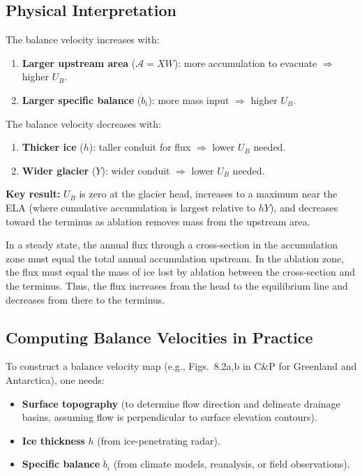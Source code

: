 \documentclass[11pt]{article}
\begin{document}
\subsection{Physical Interpretation}

The balance velocity increases with:
\begin{enumerate}
  \item \textbf{Larger upstream area} ($\mathcal{A} = XW$): more accumulation to evacuate $\Rightarrow$ higher $U_B$.
  \item \textbf{Larger specific balance} ($\dot{b}_i$): more mass input $\Rightarrow$ higher $U_B$.
\end{enumerate}

The balance velocity decreases with:
\begin{enumerate}[resume]
  \item \textbf{Thicker ice} ($h$): taller conduit for flux $\Rightarrow$ lower $U_B$ needed.
  \item \textbf{Wider glacier} ($Y$): wider conduit $\Rightarrow$ lower $U_B$ needed.
\end{enumerate}


\medskip
\noindent \textbf{Key result:} $U_B$ is zero at the glacier head, increases to a maximum near the ELA (where cumulative accumulation is largest relative to $hY$), and decreases toward the terminus as ablation removes mass from the upstream area.

In a steady state, the annual flux through a cross-section in the accumulation zone must equal the total annual accumulation upstream.  In the ablation zone, the flux must equal the mass of ice lost by ablation between the cross-section and the terminus.  Thus, the flux increases from the head to the equilibrium line and decreases from there to the terminus.

\subsection{Computing Balance Velocities in Practice}

To construct a balance velocity map (e.g., Figs.~8.2a,b in C\&P for Greenland and Antarctica), one needs:
\begin{itemize}
  \item \textbf{Surface topography} (to determine flow direction and delineate drainage basins, assuming flow is perpendicular to surface elevation contours).
  \item \textbf{Ice thickness} $h$ (from ice-penetrating radar).
  \item \textbf{Specific balance} $\dot{b}_i$ (from climate models, reanalysis, or field observations).
\end{itemize}
\end{document}

